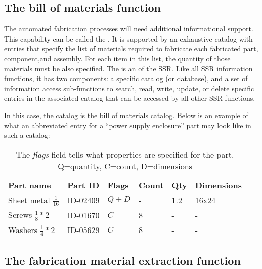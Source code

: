 \subsection{The bill of materials function}

The automated fabrication
processes will need additional informational support. 
This capability can be called the . It is supported by
an exhaustive catalog with entries that specify  the list of materials required to fabricate
each  
fabricated part, component,and assembly.
For each item in this
list, the quantity of those materials must be also
specified. The  is an  of
the SSR. Like all SSR information functions, it has two components: a specific catalog (or database),
 and a set of information access sub-functions to search, read, write, update, or delete specific entries in 
the associated catalog that can be accessed by all other SSR functions.  

In this case, the catalog
is the bill of materials catalog.  
Below is an example of what an abbreviated
entry for a “power supply enclosure” part may look like in such a catalog:

\begin{table}[h]
\caption{Example Entries in the Bill of Materials Catalog for the ``Power Supply Enclosure'' part}
\begin{center}
\begin{tabular}{| l l l l l l |}
\hline
\textbf{Part name} &
\textbf{Part ID} &
\textbf{Flags} &
\textbf{Count} &
\textbf{Qty} &
\textbf{Dimensions}\\
Sheet metal $\frac{1}{16}$ &
ID-02409
 &
$Q + D$
 &
- &
1.2
 &
16x24
\\
Screws $\frac{1}{8}*2$ &
ID-01670
 &
$C$
 &
8 &
-
 &
-
\\
Washers $\frac{1}{4}*2$ &
ID-05629
 &
$C$
 &
8 &
-
 &
-
\\\hline
\end{tabular}
\end{center}
\caption*{The \textit{flags} field tells what properties are specified for the part.  Q=quantity, C=count, D=dimensions}
\end{table}

\subsection[The fabrication material extraction function]{The fabrication material extraction function}

